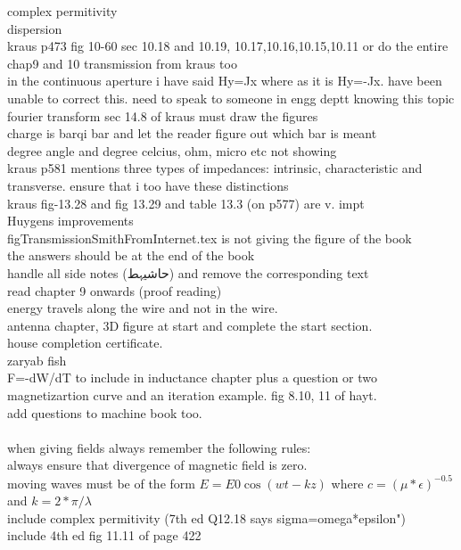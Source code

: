 \begin{otherlanguage}{english}
complex permitivity\\
dispersion\\
kraus p473 fig 10-60 sec 10.18 and 10.19, 10.17,10.16,10.15,10.11 or do the entire chap9 and 10  transmission from kraus too\\
in the continuous aperture i have said Hy=Jx where as it is Hy=-Jx. have been unable to correct this. need to speak to someone in engg deptt knowing this topic\\
fourier transform sec 14.8 of kraus must draw the figures\\
charge is barqi bar and let the reader figure out which bar is meant\\
degree angle and degree celcius, ohm, micro etc not showing\\
kraus p581 mentions three types of impedances: intrinsic, characteristic and transverse. ensure that i too have these distinctions\\
kraus fig-13.28 and fig 13.29 and table 13.3 (on p577) are v. impt\\
Huygens improvements\\
figTransmissionSmithFromInternet.tex is not giving the figure of the book\\
the answers should be at the end of the book\\
handle all side notes (حاشیہط) and remove the corresponding text\\
read chapter 9 onwards (proof reading)\\
energy travels along the wire and not in the wire.\\
antenna chapter, 3D figure at start and complete the start section.\\
house completion certificate.\\
zaryab fish\\
F=-dW/dT to include in inductance chapter plus a question or two\\
magnetizartion curve and an iteration example. fig 8.10, 11 of hayt.\\
add questions to machine book too.\\
\\
when giving fields always remember the following rules:\\
always ensure that divergence of magnetic field is zero.\\
moving waves must be of the form $E=E0 \cos(wt-kz)$ where $c=(\mu*\epsilon)^{-0.5}$ and $k=2*\pi/\lambda$\\
include complex permitivity  (7th ed Q12.18 says sigma=omega*epsilon")\\
include 4th ed fig 11.11 of page 422
\end{otherlanguage}
